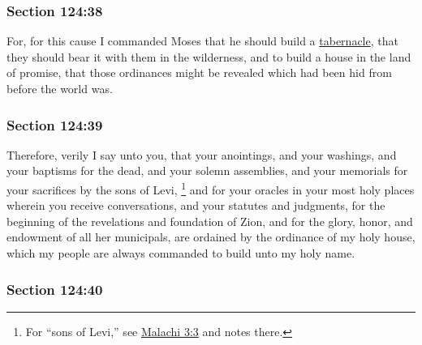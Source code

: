 	\subsubsection{Section 124:38} %
		\label{DC124-38}

		For, for this cause I commanded Moses that he should build a \hyperref[TABERNACLE]{tabernacle}, that they should bear it with them in the wilderness, and to build a house in the land of promise, that those ordinances might be revealed which had been hid from before the world was.


	\subsubsection{Section 124:39} %
		\label{DC124-39}

		Therefore, verily I say unto you, that your anointings, and your washings, and your baptisms for the dead, and your solemn assemblies, and your memorials for your sacrifices by the sons of Levi,%
			\footnote{%
				For ``sons of Levi,'' see \hyperref[MALACHI-3-3]{Malachi 3:3} and notes there.
				}
		and for your oracles in your most holy places wherein you receive conversations, and your statutes and judgments, for the beginning of the revelations and foundation of Zion, and for the glory, honor, and endowment of all her municipals, are ordained by the ordinance of my holy house, which my people are always commanded to build unto my holy name.


	\subsubsection{Section 124:40} %
		\label{DC124-40}

